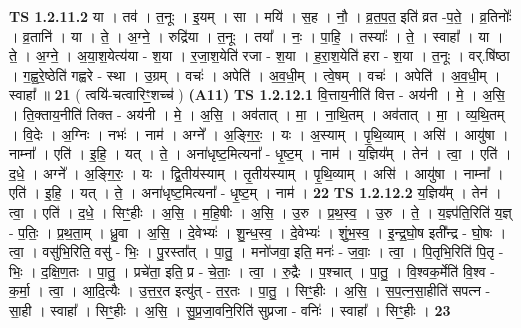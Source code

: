 \documentclass[17pt]{extarticle}
\begin{document}
                  \newline
                                \textbf{ TS 1.2.11.2} \newline
                  या । तव॑ । त॒नूः । इ॒यम् । सा । मयि॑ । स॒ह । नौ॒ । व्र॒त॒प॒त॒ इति॑ व्रत -प॒ते॒ । व्र॒तिनोः᳚ । व्र॒तानि॑ । या । ते॒ । अ॒ग्ने॒ । रुद्रि॑या । त॒नूः । तया᳚ । नः॒ । पा॒हि॒ । तस्याः᳚ । ते॒ । स्वाहा᳚ । या । ते॒ । अ॒ग्ने॒ । अ॒या॒श॒येत्य॑या - श॒या । र॒जा॒श॒येति॑ रजा - श॒या । ह॒रा॒श॒येति॑ हरा - श॒या । त॒नूः । वर्.षि॑ष्ठा । ग॒ह्व॒रे॒ष्ठेति॑ गह्वरे - स्था । उ॒ग्रम् । वचः॑ । अपेति॑ । अ॒व॒धी॒म् । त्वे॒षम् । वचः॑ । अपेति॑ । अ॒व॒धी॒म् । स्वाहा᳚ ॥ \textbf{  21 } \newline
                  \newline
                      ( त्वयि॑-चत्वारिꣳ॒॒शच्च॑ )  \textbf{(A11)} \newline \newline
                                \textbf{ TS 1.2.12.1} \newline
                  वि॒त्ताय॒नीति॑ वित्त - अय॑नी । मे॒ । अ॒सि॒ । ति॒क्ताय॒नीति॑ तिक्त - अय॑नी । मे॒ । अ॒सि॒ । अव॑तात् । मा॒ । ना॒थि॒तम् । अव॑तात् । मा॒ । व्य॒थि॒तम् । वि॒देः । अ॒ग्निः । नभः॑ । नाम॑ । अग्ने᳚ । अ॒ङ्गि॒रः॒ । यः । अ॒स्याम् । पृ॒थि॒व्याम् । असि॑ । आयु॑षा । नाम्ना᳚ । एति॑ । इ॒हि॒ । यत् । ते॒ । अना॑धृष्ट॒मित्यना᳚ - धृ॒ष्ट॒म् । नाम॑ । य॒ज्ञिय᳚म् । तेन॑ । त्वा॒ । एति॑ । द॒धे॒ । अग्ने᳚ । अ॒ङ्गि॒रः॒ । यः । द्वि॒तीय॑स्याम् । तृ॒तीय॑स्याम् । पृ॒थि॒व्याम् । असि॑ । आयु॑षा । नाम्ना᳚ । एति॑ । इ॒हि॒ । यत् । ते॒ । अना॑धृष्ट॒मित्यना᳚ - धृ॒ष्ट॒म् । नाम॑ । \textbf{  22} \newline
                  \newline
                                \textbf{ TS 1.2.12.2} \newline
                  य॒ज्ञिय᳚म् । तेन॑ । त्वा॒ । एति॑ । द॒धे॒ । सिꣳ॒॒हीः । अ॒सि॒ । म॒हि॒षीः । अ॒सि॒ । उ॒रु । प्र॒थ॒स्व॒ । उ॒रु । ते॒ । य॒ज्ञ्प॑ति॒रिति॑ य॒ज्ञ् - प॒तिः॒ । प्र॒थ॒ता॒म् । ध्रु॒वा । अ॒सि॒ । दे॒वेभ्यः॑ । शु॒न्ध॒स्व॒ । दे॒वेभ्यः॑ । शुं॒भ॒स्व॒ । इ॒न्द्र॒घो॒ष इती᳚न्द्र - घो॒षः । त्वा॒ । वसु॑भि॒रिति॒ वसु॑ - भिः॒ । पु॒रस्ता᳚त् । पा॒तु॒ । मनो॑जवा॒ इति॒ मनः॑ - ज॒वाः॒ । त्वा॒ । पि॒तृभि॒रिति॑ पि॒तृ - भिः॒ । द॒क्षि॒ण॒तः । पा॒तु॒ । प्रचे॑ता॒ इति॒ प्र - चे॒ताः॒ । त्वा॒ । रु॒द्रैः । प॒श्चात् । पा॒तु॒ । वि॒श्वक॒र्मेति॑ वि॒श्व - क॒र्मा॒ । त्वा॒ । आ॒दि॒त्यैः । उ॒त्त॒र॒त इत्यु॑त् - त॒र॒तः । पा॒तु॒ । सिꣳ॒॒हीः । अ॒सि॒ । स॒प॒त्न॒सा॒हीति॑ सपत्न - सा॒ही । स्वाहा᳚ । सिꣳ॒॒हीः । अ॒सि॒ । सु॒प्र॒जा॒वनि॒रिति॑ सुप्रजा - वनिः॑ । स्वाहा᳚ । सिꣳ॒॒हीः । \textbf{  23} \newline
\end{document}
